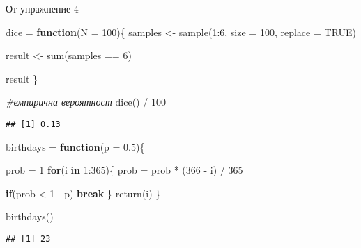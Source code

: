 \documentclass[
]{article}
\newenvironment{Shaded}{\begin{snugshade}}{\end{snugshade}}
\newcommand{\AttributeTok}[1]{\textcolor[rgb]{0.77,0.63,0.00}{#1}}
\newcommand{\CommentTok}[1]{\textcolor[rgb]{0.56,0.35,0.01}{\textit{#1}}}
\newcommand{\ConstantTok}[1]{\textcolor[rgb]{0.00,0.00,0.00}{#1}}
\newcommand{\ControlFlowTok}[1]{\textcolor[rgb]{0.13,0.29,0.53}{\textbf{#1}}}
\newcommand{\DecValTok}[1]{\textcolor[rgb]{0.00,0.00,0.81}{#1}}
\newcommand{\FloatTok}[1]{\textcolor[rgb]{0.00,0.00,0.81}{#1}}
\newcommand{\FunctionTok}[1]{\textcolor[rgb]{0.00,0.00,0.00}{#1}}
\newcommand{\NormalTok}[1]{#1}
\newcommand{\OtherTok}[1]{\textcolor[rgb]{0.56,0.35,0.01}{#1}}
\newcommand{\SpecialCharTok}[1]{\textcolor[rgb]{0.00,0.00,0.00}{#1}}
\begin{document}
От упражнение 4

\begin{Shaded}
\begin{Highlighting}[]
\NormalTok{dice }\OtherTok{=} \ControlFlowTok{function}\NormalTok{(}\AttributeTok{N =} \DecValTok{100}\NormalTok{)\{}
\NormalTok{  samples }\OtherTok{\textless{}{-}} \FunctionTok{sample}\NormalTok{(}\DecValTok{1}\SpecialCharTok{:}\DecValTok{6}\NormalTok{, }\AttributeTok{size =} \DecValTok{100}\NormalTok{, }\AttributeTok{replace =} \ConstantTok{TRUE}\NormalTok{)}
  
\NormalTok{  result }\OtherTok{\textless{}{-}} \FunctionTok{sum}\NormalTok{(samples }\SpecialCharTok{==} \DecValTok{6}\NormalTok{)}
  
\NormalTok{  result}
\NormalTok{\}}

\CommentTok{\#емпирична вероятност}
\FunctionTok{dice}\NormalTok{() }\SpecialCharTok{/} \DecValTok{100}
\end{Highlighting}
\end{Shaded}

\begin{verbatim}
## [1] 0.13
\end{verbatim}

\begin{Shaded}
\begin{Highlighting}[]
\NormalTok{birthdays }\OtherTok{=} \ControlFlowTok{function}\NormalTok{(}\AttributeTok{p =} \FloatTok{0.5}\NormalTok{)\{}
  
\NormalTok{  prob }\OtherTok{=} \DecValTok{1}
  \ControlFlowTok{for}\NormalTok{(i }\ControlFlowTok{in} \DecValTok{1}\SpecialCharTok{:}\DecValTok{365}\NormalTok{)\{}
\NormalTok{    prob }\OtherTok{=}\NormalTok{ prob }\SpecialCharTok{*}\NormalTok{ (}\DecValTok{366} \SpecialCharTok{{-}}\NormalTok{ i) }\SpecialCharTok{/} \DecValTok{365}
    
    \ControlFlowTok{if}\NormalTok{(prob }\SpecialCharTok{\textless{}}  \DecValTok{1} \SpecialCharTok{{-}}\NormalTok{ p) }\ControlFlowTok{break}
\NormalTok{  \}}
      \FunctionTok{return}\NormalTok{(i)}
\NormalTok{\}}

\FunctionTok{birthdays}\NormalTok{()}
\end{Highlighting}
\end{Shaded}

\begin{verbatim}
## [1] 23
\end{verbatim}
\end{document}
